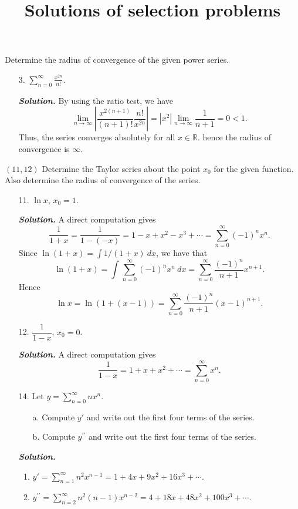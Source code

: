 \documentclass[12pt,a4paper]{article}
\title{Solutions of selection problems}
\newcommand{\bfit}[1]{%
    \textbf{\textit{#1}}}
\newcommand{\re}{\mathbb{R}}
\begin{document}
\fontsize{12pt}{20pt}\selectfont
Determine the radius of convergence of the given power series.
\begin{enumerate}
    \item[3.] $\displaystyle \sum_{n=0}^{\infty}\frac{x^{2n}}{n!}$. 
    
    \bfit{Solution.} By using the ratio test, we have 
    \[
        \lim_{{n}\to {\infty}} \left|\frac{x^{2(n + 1)}}{(n + 1)!} \frac{n!}{x^{2n}}\right| = \left|x^2\right|\lim_{{n}\to {\infty}} \frac{1}{n + 1} = 0 < 1. 
    \]
    Thus, the series converges absolutely for all $x \in \re$. hence the radius of convergence is $\infty$.
\end{enumerate}
$(11,12)$ Determine the Taylor series about the point $x_0$ for the given function. Also determine the radius of convergence of the series.
\begin{enumerate}
    \item[11.] $\ln x$, $x_0 = 1$. 
    
    \bfit{Solution.} A direct computation gives
    \[
        \frac{1}{1 + x} = \frac{1}{1 - ( - x)} = 1 - x + x^2 - x^3 + \cdots = \sum_{n=0}^{\infty}( - 1)^n x^n.
    \]
    Since $\ln (1 + x) = \int 1 / (1 +x)\ dx$, we have that 
    \[
        \ln (1 + x) = \int_{}^{} \sum_{n=0}^{\infty}( - 1)^n x^n \ dx = \sum_{n=0}^{\infty}  \frac{( - 1)^n}{n + 1} x^{n + 1}.
    \]
    Hence 
    \[
        \ln x = \ln (1 + (x - 1)) = \sum_{n=0}^{\infty} \frac{( - 1)^n}{n + 1}(x - 1)^{n + 1}.
    \]
    \item[12.] $\dfrac{1}{1-x}$, $x_0 = 0$.
    
    \bfit{Solution.} A direct computation gives 
    \[
        \frac{1}{1 - x} = 1 + x + x^2 + \cdots = \sum_{n=0}^{\infty} x^n.
    \]
    \item[14.] Let $\displaystyle y = \sum_{n=0}^{\infty}nx^n$.
    \begin{enumerate}
        \item[a.]Compute $y'$ and write out the first four terms of the series.
        \item[b.]Compute $y^{\prime\prime}$ and write out the first four terms of the series.
    \end{enumerate} 
    \bfit{Solution.} \begin{enumerate}[label=\alph*.,noitemsep,topsep=0pt]
        \item $\displaystyle y' = \sum_{n=1}^{\infty}n ^2 x^{n - 1} = 1 + 4x + 9x ^2 + 16 x ^3 +\cdots $.
        \item $\displaystyle y^{\prime\prime} = \sum_{n=2}^{\infty}n ^2 (n - 1) x^{n - 2} = 4 + 18x + 48x ^2  + 100 x ^3 +\cdots $.                 
    \end{enumerate}
\end{enumerate}
\end{document}
